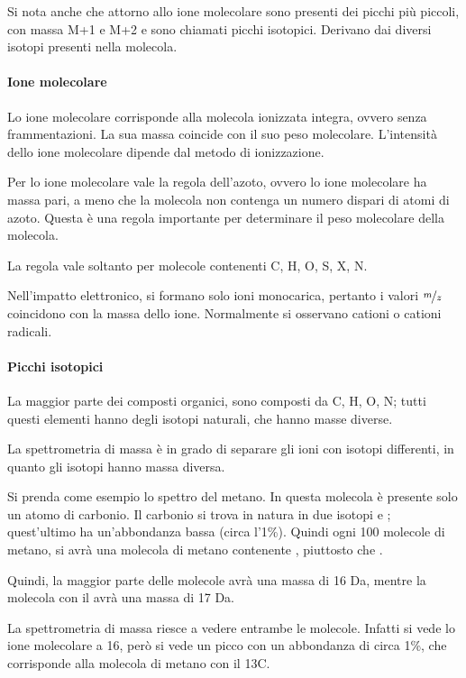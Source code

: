 Si nota anche che attorno allo ione molecolare sono presenti dei picchi
più piccoli, con massa M+1 e M+2 e sono chiamati picchi isotopici.
Derivano dai diversi isotopi presenti nella molecola.

\paragraph{Ione molecolare}

Lo ione molecolare corrisponde alla molecola ionizzata integra, ovvero
senza frammentazioni. La sua massa coincide con il suo peso molecolare.
L'intensità dello ione molecolare dipende dal metodo di ionizzazione.

Per lo ione molecolare vale la regola dell'azoto, ovvero lo ione
molecolare ha massa pari, a meno che la molecola non contenga un numero
dispari di atomi di azoto. Questa è una regola importante per
determinare il peso molecolare della molecola.

La regola vale soltanto per molecole contenenti C, H, O, S, X, N.

Nell'impatto elettronico, si formano solo ioni monocarica, pertanto i
valori $\nicefrac{m}{z}$ coincidono con la massa dello ione. Normalmente si osservano
cationi o cationi radicali.

\paragraph{Picchi isotopici}

La maggior parte dei composti organici, sono composti da C, H, O, N;
tutti questi elementi hanno degli isotopi naturali, che hanno masse
diverse.

La spettrometria di massa è in grado di separare gli ioni con isotopi
differenti, in quanto gli isotopi hanno massa diversa.


Si prenda come esempio lo spettro del metano. In questa molecola è
presente solo un atomo di carbonio. Il carbonio si trova in natura in
due isotopi  e ; quest'ultimo ha un'abbondanza bassa (circa
l'1\%). Quindi ogni 100 molecole di metano, si avrà una molecola di
metano contenente , piuttosto che .

Quindi, la maggior parte delle molecole avrà una massa di 16 Da, mentre
la molecola con il  avrà una massa di 17 Da.

La spettrometria di massa riesce a vedere entrambe le molecole. Infatti
si vede lo ione molecolare a 16, però si vede un picco con un abbondanza
di circa 1\%, che corrisponde alla molecola di metano con il 13C.

